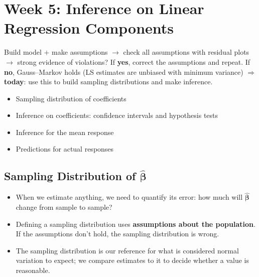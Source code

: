 
\section{Week 5: Inference on Linear Regression Components}

\begin{remark}
    Build model $+$ make assumptions $\to$ check all assumptions with residual
    plots $\to$ strong evidence of violations? If \textbf{yes}, correct the
    assumptions and repeat. If \textbf{no}, Gauss--Markov holds (LS estimates
    are unbiased with minimum variance) $\Rightarrow$ \textbf{today}: use this to
    build sampling distributions and make inference.
\end{remark}

\begin{itemize}
    \item Sampling distribution of coefficients
    \item Inference on coefficients: confidence intervals and hypothesis tests
    \item Inference for the mean response
    \item Predictions for actual responses
\end{itemize}

\subsection{Sampling Distribution of $\hat{\boldsymbol\beta}$}

\begin{remark}
    \begin{itemize}
        \item When we estimate anything, we need to quantify its error: how much
        will $\hat{\boldsymbol\beta}$ change from sample to sample?
        \item Defining a sampling distribution uses \textbf{assumptions about the
        population}. If the assumptions don't hold, the sampling distribution is wrong.
        \item The sampling distribution is our reference for what is considered
        normal variation to expect; we compare estimates to it to decide whether a
        value is reasonable.
    \end{itemize}
\end{remark}


